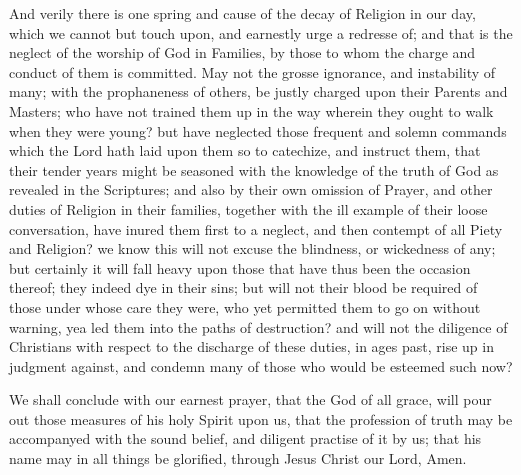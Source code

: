 \documentclass[12pt,a4paper]{book}
\begin{document}
And verily there is one spring and cause of the decay of Religion in our day, which we cannot but touch upon, and earnestly urge a redresse of; and that is the neglect of the worship of God in Families, by those to whom the charge and conduct of them is committed. May not the grosse ignorance, and instability of many; with the prophaneness of others, be justly charged upon their Parents and Masters; who have not trained them up in the way wherein they ought to walk when they were young? but have neglected those frequent and solemn commands which the Lord hath laid upon them so to catechize, and instruct them, that their tender years might be seasoned with the knowledge of the truth of God as revealed in the Scriptures; and also by their own omission of Prayer, and other duties of Religion in their families, together with the ill example of their loose conversation, have inured them first to a neglect, and then contempt of all Piety and Religion? we know this will not excuse the blindness, or wickedness of any; but certainly it will fall heavy upon those that have thus been the occasion thereof; they indeed dye in their sins; but will not their blood be required of those under whose care they were, who yet permitted them to go on without warning, yea led them into the paths of destruction? and will not the diligence of Christians with respect to the discharge of these duties, in ages past, rise up in judgment against, and condemn many of those who would be esteemed such now?

We shall conclude with our earnest prayer, that the God of all grace, will pour out those measures of his holy Spirit upon us, that the profession of truth may be accompanyed with the sound belief, and diligent practise of it by us; that his name may in all things be glorified, through Jesus Christ our Lord, Amen.

\mainmatter
\end{document}
